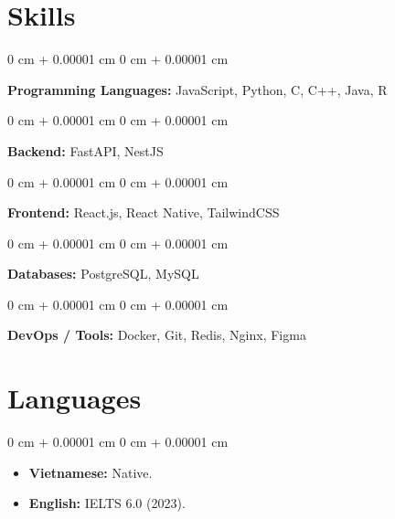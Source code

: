 \documentclass[10pt, letterpaper]{article}
\newenvironment{highlights}{
    \begin{itemize}[
        topsep=0.10 cm,
        parsep=0.10 cm,
        partopsep=0pt,
        itemsep=0pt,
        leftmargin=0 cm + 10pt
    ]
}
{
    \end{itemize}
}
\newenvironment{onecolentry}{
    \begin{adjustwidth}{
        0 cm + 0.00001 cm
    }{
        0 cm + 0.00001 cm
    }
}
{
    \end{adjustwidth}
}
\newenvironment{twocolentry}[2][]{
    \onecolentry
    \def\secondColumn{#2}
    \setcolumnwidth{\fill, 4.5 cm}
    \begin{paracol}{2}
}
{
    \switchcolumn \raggedleft \secondColumn
    \end{paracol}
    \endonecolentry
}
\begin{document}
\section{Skills}
\begin{onecolentry}
\textbf{Programming Languages:} JavaScript, Python, C, C++, Java, R
\end{onecolentry}
\vspace{0.1 cm}

\begin{onecolentry}
\textbf{Backend:} FastAPI, NestJS
\end{onecolentry}
\vspace{0.1 cm}

\begin{onecolentry}
\textbf{Frontend:} React.js, React Native, TailwindCSS
\end{onecolentry}
\vspace{0.1 cm}

\begin{onecolentry}
\textbf{Databases:} PostgreSQL, MySQL
\end{onecolentry}
\vspace{0.1 cm}

\begin{onecolentry}
\textbf{DevOps / Tools:} Docker, Git, Redis, Nginx, Figma
\end{onecolentry}


    \section{Languages}
        \begin{onecolentry}
            \begin{highlights}
                \item \textbf{Vietnamese:} Native.
                \item \textbf{English:} IELTS 6.0 (2023).
            \end{highlights}
        \end{onecolentry}

\end{document}
